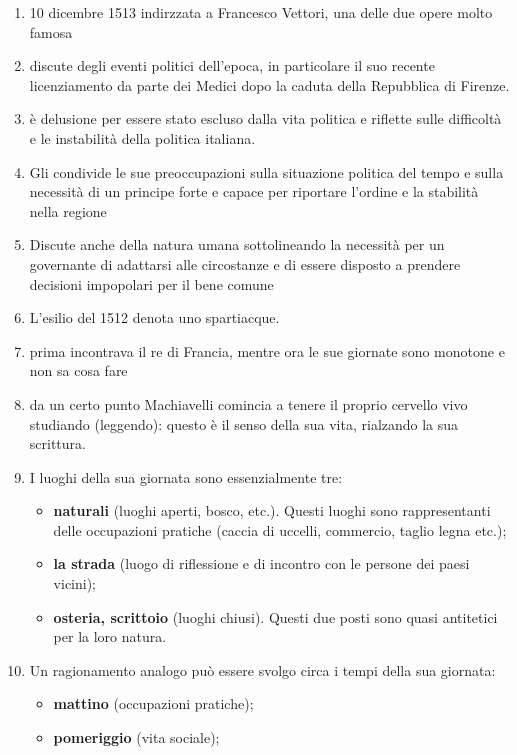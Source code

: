 \documentclass{article}
\begin{document}
\begin{enumerate}
    \item 10 dicembre 1513 indirzzata a Francesco Vettori, una delle due opere molto famosa
    \item discute degli eventi politici dell’epoca, in particolare il suo recente licenziamento da parte dei Medici dopo la caduta della Repubblica di Firenze.
    \item è delusione per essere stato escluso dalla vita
    politica e riflette sulle difficoltà e le instabilità della politica italiana.
    \item Gli condivide le sue preoccupazioni
    sulla situazione politica del tempo e sulla necessità di un principe forte e capace per riportare l’ordine e
    la stabilità nella regione
    \item Discute anche della natura umana sottolineando la necessità per un
    governante di adattarsi alle circostanze e di essere disposto a prendere decisioni impopolari per il bene
    comune
    \item L’esilio del 1512 denota uno spartiacque.
    \item prima incontrava il re di Francia, mentre ora le
    sue giornate sono monotone e non sa cosa fare
    \item da un certo punto Machiavelli comincia a tenere
    il proprio cervello vivo studiando (leggendo): questo è il senso della sua vita, rialzando la sua scrittura.
    \item I luoghi della sua giornata sono essenzialmente tre:
    \begin{itemize}
        \item \textbf{naturali} (luoghi aperti, bosco, etc.).
            Questi luoghi sono rappresentanti delle occupazioni pratiche (caccia di uccelli, commercio, taglio legna etc.);
        \item \textbf{la strada} (luogo di riflessione e di incontro con le persone dei paesi vicini);
        \item \textbf{osteria, scrittoio} (luoghi chiusi). Questi due posti sono quasi antitetici per la loro natura.
    \end{itemize}
    \item Un ragionamento analogo può essere svolgo circa i tempi della sua giornata:
    \begin{itemize}
        \item \textbf{mattino} (occupazioni pratiche);
        \item \textbf{pomeriggio} (vita sociale);

\end{itemize}
\end{enumerate}
\end{document}
